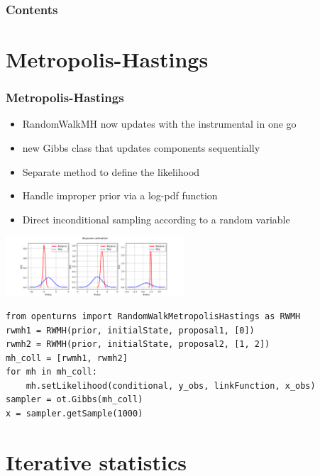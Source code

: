 \documentclass{beamer}
\begin{document}



\begin{frame}
\frametitle{Contents}
\tableofcontents
\end{frame}

\section{Metropolis-Hastings}
% 
\begin{frame}[containsverbatim]
\frametitle{Metropolis-Hastings}

\begin{itemize}
\item RandomWalkMH now updates with the instrumental in one go
\item new Gibbs class that updates components sequentially
\item Separate method to define the likelihood
\item Handle improper prior via a log-pdf function
\item Direct inconditional sampling according to a random variable
\end{itemize}

 
\begin{center}
\includegraphics[width=0.5\textwidth]{figures/sphx_glr_plot_bayesian_calibration_002.png}
\end{center}


\lstset{language=python}
\begin{lstlisting}
from openturns import RandomWalkMetropolisHastings as RWMH
rwmh1 = RWMH(prior, initialState, proposal1, [0])
rwmh2 = RWMH(prior, initialState, proposal2, [1, 2])
mh_coll = [rwmh1, rwmh2]
for mh in mh_coll:
    mh.setLikelihood(conditional, y_obs, linkFunction, x_obs)
sampler = ot.Gibbs(mh_coll)
x = sampler.getSample(1000)
\end{lstlisting}


\end{frame}

\section{Iterative statistics}
\end{document}
